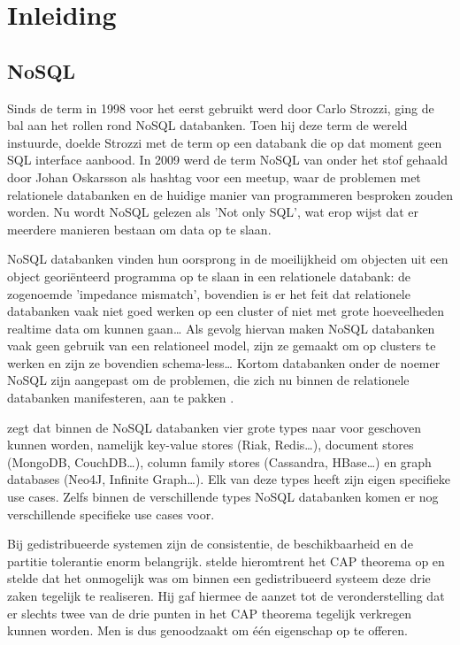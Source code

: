 \chapter{Inleiding}
\label{ch:inleiding}

\section{NoSQL}
Sinds de term in 1998 voor het eerst gebruikt werd door Carlo Strozzi, ging de bal aan het rollen rond NoSQL databanken.
Toen hij deze term de wereld instuurde, doelde Strozzi met de term op een databank die op dat moment geen SQL interface aanbood.
In 2009 werd de term NoSQL van onder het stof gehaald door Johan Oskarsson als hashtag voor een meetup, waar de problemen met relationele databanken en de huidige manier van programmeren besproken zouden worden.
Nu wordt NoSQL gelezen als 'Not only SQL', wat erop wijst dat er meerdere manieren bestaan om data op te slaan. \citep{Fowler2013Introduction}

NoSQL databanken vinden hun oorsprong in de moeilijkheid om objecten uit een object georiënteerd programma op te slaan in een relationele databank: de  zogenoemde 'impedance mismatch', bovendien is er het feit dat relationele databanken vaak niet goed werken op een cluster of niet met grote hoeveelheden realtime data om kunnen gaan\dots
Als gevolg hiervan maken NoSQL databanken vaak geen gebruik van een relationeel model, zijn ze gemaakt om op clusters te werken en zijn ze bovendien schema-less\dots
Kortom databanken onder de noemer NoSQL zijn aangepast om de problemen, die zich nu binnen de relationele databanken manifesteren, aan te pakken \citep{Fowler2012NoSQLDef}.

\cite{Sadalage2014OverviewNoSQL} zegt dat binnen de NoSQL databanken vier grote types naar voor geschoven kunnen worden, namelijk key-value stores (Riak, Redis\dots), document stores (MongoDB, CouchDB\dots), column family stores (Cassandra, HBase\dots) en graph databases (Neo4J, Infinite Graph\dots).
Elk van deze types heeft zijn eigen specifieke use cases.
Zelfs binnen de verschillende types NoSQL databanken komen er nog verschillende specifieke use cases voor.

Bij gedistribueerde systemen zijn de consistentie, de beschikbaarheid en de partitie tolerantie enorm belangrijk.
\cite{brewer2000towards} stelde hieromtrent het CAP theorema op en stelde dat het onmogelijk was om binnen een gedistribueerd systeem deze drie zaken tegelijk te realiseren.
Hij gaf hiermee de aanzet tot de veronderstelling dat er slechts twee van de drie punten in het CAP theorema tegelijk verkregen kunnen worden.
Men is dus genoodzaakt om één eigenschap op te offeren.

